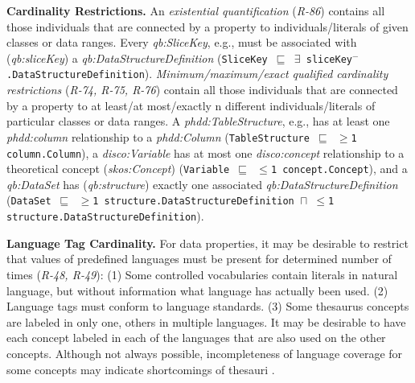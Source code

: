 \documentclass{llncs}
\newcommand{\ms}[1]{\texttt{#1}}
\begin{document}
{{\textbf{Cardinality Restrictions.}
An \emph{existential quantification} (\emph{R-86}) contains all those individuals that are connected by a property to individuals/literals of given classes or data ranges.
Every \emph{qb:SliceKey}, e.g., must be associated with (\emph{qb:sliceKey}) a \emph{qb:DataStructureDefinition} (\ms{SliceKey $\sqsubseteq$ $\exists$ sliceKey$^{-}$.DataStructureDefinition}).
\emph{Minimum/maximum/exact qualified cardinality restrictions} (\emph{R-74, R-75, R-76}) contain all those individuals that are connected by a property to at least/at most/exactly n different individuals/literals of particular classes or data ranges.
A \emph{phdd:TableStructure}, e.g., has at least one \emph{phdd:column} relationship to a \emph{phdd:Column} (\ms{TableStructure $\sqsubseteq$ $\geq$1 column.Column}),
a \emph{disco:Variable} has at most one \emph{disco:concept} relationship to a theoretical concept (\emph{skos:Concept}) (\ms{Variable $\sqsubseteq$ $\leq$1 concept.Concept}), and a \emph{qb:DataSet} has (\emph{qb:structure}) exactly one associated \emph{qb:DataStructureDefinition} (\ms{DataSet $\sqsubseteq$ $\geq$1 structure.DataStructureDefinition $\sqcap$ $\leq$1 structure.DataStructureDefinition}).

%
%
%


\textbf{Language Tag Cardinality.}
For data properties, it may be desirable to restrict that values of predefined languages must be present for determined number of times (\emph{R-48, R-49}):
(1) Some controlled vocabularies contain literals in natural language, but without information what language has actually been used. 
(2) Language tags must conform to language standards. 
(3) Some thesaurus concepts are labeled in only one, others in multiple languages. It may be desirable to have each concept labeled in each of the languages that are also used on the other concepts. Although not always possible, incompleteness of language coverage for some concepts may indicate shortcomings of thesauri
\cite{MaderHaslhoferIsaac2012}.

}}
\end{document}
